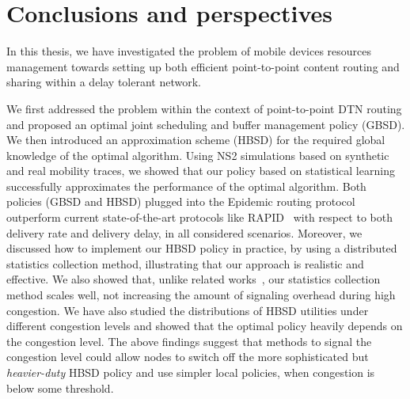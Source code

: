 \chapter{Conclusions and perspectives}
\label{chapter:conclusions}

In this thesis, we have investigated the problem of mobile devices resources management towards setting up both efficient point-to-point content routing and sharing within a delay tolerant network.
  
We first addressed the problem within the context of point-to-point DTN routing and proposed an optimal joint scheduling and buffer management policy (GBSD). We then introduced an approximation scheme (HBSD) for the required global knowledge of the optimal algorithm. Using NS2 simulations based on synthetic and real mobility traces, we showed that our policy based on statistical learning successfully approximates the performance of the optimal algorithm. Both policies (GBSD and HBSD) plugged into the Epidemic routing protocol outperform current state-of-the-art protocols like RAPID~\cite{Levine:Sigcomm07} with respect to both delivery rate and delivery delay, in all considered scenarios. Moreover, we discussed how to implement our HBSD policy in practice, by using a distributed statistics collection method, illustrating that our approach is realistic and effective. We also showed that, unlike related works~\cite{Levine:Sigcomm07, AOBM}, our statistics collection method scales well, not increasing the amount of signaling overhead during high congestion. We have also studied the distributions of HBSD utilities under different congestion levels and showed that the optimal policy heavily depends on the congestion level. The above findings suggest that methods to signal the congestion level could allow nodes to switch off the more sophisticated but \emph{heavier-duty} HBSD policy and use simpler local policies, when congestion is below some threshold. 

